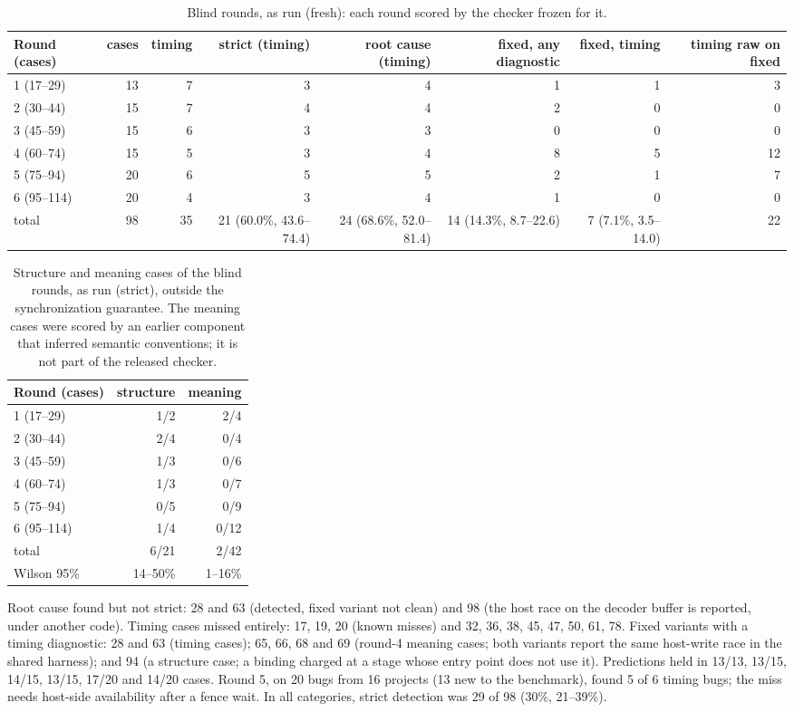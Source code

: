 \documentclass[acmtog,anonymous,review]{acmart}
\begin{document}
\begin{table}[t]
\caption{Blind rounds, as run (fresh): each round scored by the checker frozen for it.}
\label{tab:s-rounds}
\small
\begin{tabular}{@{}lrrrrrrr@{}}
\toprule
Round (cases) & cases & timing & strict (timing) & root cause (timing) & fixed, any diagnostic & fixed, timing & timing raw on fixed \\
\midrule
1 (17--29) & 13 & 7 & 3 & 4 & 1 & 1 & 3 \\
2 (30--44) & 15 & 7 & 4 & 4 & 2 & 0 & 0 \\
3 (45--59) & 15 & 6 & 3 & 3 & 0 & 0 & 0 \\
4 (60--74) & 15 & 5 & 3 & 4 & 8 & 5 & 12 \\
5 (75--94) & 20 & 6 & 5 & 5 & 2 & 1 & 7 \\
6 (95--114) & 20 & 4 & 3 & 4 & 1 & 0 & 0 \\
\midrule
total & 98 & 35 & 21 (60.0\%, 43.6--74.4) & 24 (68.6\%, 52.0--81.4) & 14 (14.3\%, 8.7--22.6) & 7 (7.1\%, 3.5--14.0) & 22 \\
\bottomrule
\end{tabular}
\end{table}

\begin{table}[t]
\caption{Structure and meaning cases of the blind rounds, as run (strict), outside the synchronization guarantee.
The meaning cases were scored by an earlier component that inferred semantic conventions; it is not part of the
released checker.}
\label{tab:s-rounds-other}
\small
\begin{tabular}{@{}lrr@{}}
\toprule
Round (cases) & structure & meaning \\
\midrule
1 (17--29) & 1/2 & 2/4 \\
2 (30--44) & 2/4 & 0/4 \\
3 (45--59) & 1/3 & 0/6 \\
4 (60--74) & 1/3 & 0/7 \\
5 (75--94) & 0/5 & 0/9 \\
6 (95--114) & 1/4 & 0/12 \\
\midrule
total & 6/21 & 2/42 \\
Wilson 95\% & 14--50\% & 1--16\% \\
\bottomrule
\end{tabular}
\end{table}

Root cause found but not strict: 28 and 63 (detected, fixed variant not clean) and 98 (the host race on the decoder
buffer is reported, under another code). Timing cases missed entirely: 17, 19, 20 (known misses) and 32, 36, 38, 45, 47,
50, 61, 78. Fixed variants with a timing diagnostic: 28 and 63 (timing cases); 65, 66, 68 and 69 (round-4 meaning cases;
both variants report the same host-write race in the shared harness); and 94 (a structure case; a binding charged at a
stage whose entry point does not use it). Predictions held in 13/13, 13/15, 14/15, 13/15, 17/20 and 14/20 cases. Round
5, on 20 bugs from 16 projects (13 new to the benchmark), found 5 of 6 timing bugs; the miss needs host-side availability
after a fence wait. In all categories, strict detection was 29 of 98 (30\%, 21--39\%).
\end{document}
